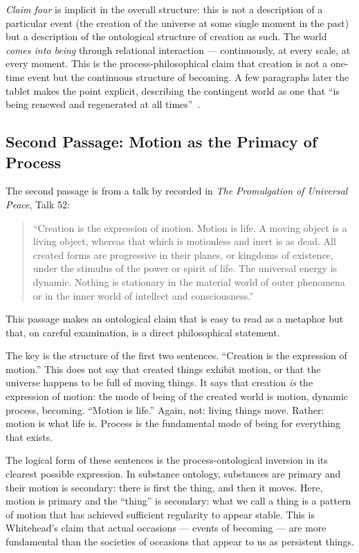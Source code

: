 \emph{Claim four} is implicit in the overall structure: this is not a description
of a particular event (the creation of the universe at some single moment in the
past) but a description of the ontological structure of creation as such.
The world \emph{comes into being} through relational interaction --- continuously,
at every scale, at every moment.
This is the process-philosophical claim that creation is not a one-time event
but the continuous structure of becoming.
A few paragraphs later the tablet makes the point explicit, describing the
contingent world as one that ``is being renewed and regenerated at all
times''~\citep{TabletsBahaullah}.

\subsection{Second Passage: Motion as the Primacy of Process}

The second passage is from a talk by \AbdulBaha recorded in \textit{The Promulgation
of Universal Peace}, Talk 52:

\begin{quote}
``Creation is the expression of motion. Motion is life. A moving object
is a living object, whereas that which is motionless and inert is as dead.
All created forms are progressive in their planes, or kingdoms of
existence, under the stimulus of the power or spirit of life. The
universal energy is dynamic. Nothing is stationary in the material world
of outer phenomena or in the inner world of intellect and consciousness.''
\citep[Talk 52]{PUP}
\end{quote}

This passage makes an ontological claim that is easy to read as a metaphor but
that, on careful examination, is a direct philosophical statement.

The key is the structure of the first two sentences.
``Creation is the expression of motion.''
This does not say that created things exhibit motion, or that the universe happens
to be full of moving things.
It says that creation \emph{is} the expression of motion: the mode of being of
the created world is motion, dynamic process, becoming.
``Motion is life.''
Again, not: living things move.
Rather: motion is what life is.
Process is the fundamental mode of being for everything that exists.

The logical form of these sentences is the process-ontological inversion in its
clearest possible expression.
In substance ontology, substances are primary and their motion is secondary:
there is first the thing, and then it moves.
Here, motion is primary and the ``thing'' is secondary: what we call a thing is
a pattern of motion that has achieved sufficient regularity to appear stable.
This is Whitehead's claim that actual occasions --- events of becoming --- are
more fundamental than the societies of occasions that appear to us as persistent
things.


